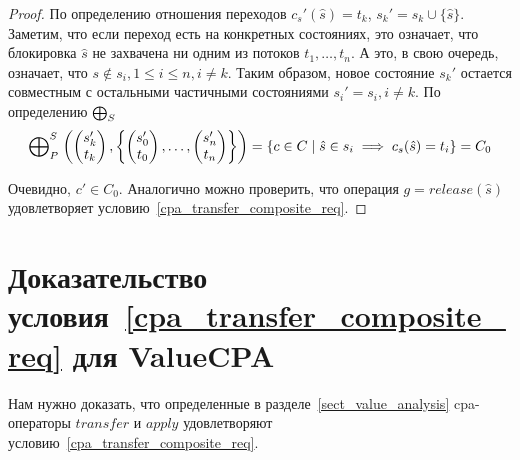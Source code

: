 \begin{proof}
По определению отношения переходов $c_s'(\hat s) = t_k$, $s_k' = s_k \cup \{\hat s\}$.
Заметим, что если переход есть на конкретных состояниях, это означает, что блокировка $\hat s$ не захвачена ни одним из потоков $t_1, \dots, t_n$.
А это, в свою очередь, означает, что $s \notin s_i, 1 \le i \le n, i \neq k$.
Таким образом, новое состояние $s_k'$ остается совместным с остальными частичными состояниями $s_i' = s_i, i \neq k$.
По определению $\mathrel{\bigoplus}_S$
\begin{align*}
\mathrel{\bigoplus}^S_P
\left(
\begin{pmatrix}
s_k' \\
t_k 
\end{pmatrix},
\left\{
\begin{pmatrix}
s_0' \\
t_0 
\end{pmatrix},
\dots ,
\begin{pmatrix}
s_n' \\
t_n 
\end{pmatrix}
\right\}
\right) = \{ c \in C \mid \hat s \in s_i \implies c_s(\hat s) = t_i \} = C_0
\end{align*}

Очевидно, $c' \in C_0$.
Аналогично можно проверить, что операция $g = release(\hat s)$ удовлетворяет условию~\ref{cpa_transfer_composite_req}. 

\end{proof}


\section{Доказательство условия~\ref{cpa_transfer_composite_req} для ValueCPA}
\label{sect_transfer_value_proof}

Нам нужно доказать, что определенные в разделе~\ref{sect_value_analysis} cpa-операторы $transfer$ и $apply$ удовлетворяют условию~\ref{cpa_transfer_composite_req}.


